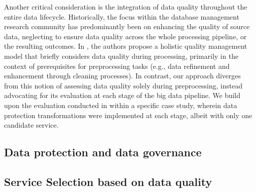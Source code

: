 Another critical consideration is the integration of data quality throughout the entire data lifecycle. Historically, the focus within the database management research community has predominantly been on enhancing the quality of source data, neglecting to ensure data quality across the whole processing pipeline, or the resulting outcomes. In \cite{BigDataQaulitySurvey}, %
the authors propose a holistic quality management model that briefly considers data quality during processing, primarily in the context of prerequisites for preprocessing tasks (e.g., data refinement and enhancement through cleaning processes). In contrast, our approach diverges from this notion of assessing data quality solely during preprocessing, instead advocating for its evaluation at each stage of the big data pipeline. We build upon the evaluation conducted in \cite{impetusPaper} within a specific case study, wherein data protection transformations were implemented at each stage, albeit with only one candidate service.

\subsection{Data protection and data governance}\label{sec:datagov}

 


\subsection{Service Selection based on data quality}\label{sec:servicesel}

